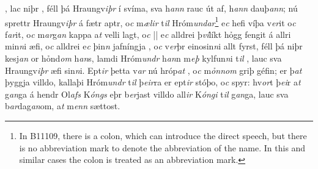 , 
 lac niþr
, 
féll þá Hraungv\textit{iþr} í  svíma,  sva h\textit{ann}  rauc  út af,    h\textit{ann} dauþ\textit{an}\textit{n}; nú  sprettr Hraungv\textit{iþr} á fætr aptr, o\textit{c} m\textit{ælir} t\textit{il}
Hróm\textit{undar}\footnote{In B11109, there is a colon, which can introduce the direct speech, but there is no abbreviation mark to denote the abbreviation of the name. In this and similar cases the colon is treated as an abbreviation mark.} 
e\textit{c} hefi  víþa v\textit{er}it o\textit{c}
f\textit{ar}it, o\textit{c} m\textit{ar}g\textit{an} kappa a\textit{t} velli lagt, o\textit{c}  ||
e\textit{c} alldrei þ\textit{ví}líkt hỏgg fengit á allri
min\textit{n}i æfi, o\textit{c} alldrei   e\textit{c} þin\textit{n} jafníngja  , o\textit{c} v\textit{er}þr einosin\textit{n}i allt  fyrst,
féll þá niþr kesj\textit{an} or hỏnd\textit{om} h\textit{an}s, lamdi Hróm\textit{undr} h\textit{an}n 
m\textit{eþ} kylfun\textit{n}i t\textit{il}   , 
lauc sva Hraungv\textit{iþr} æfi sin\textit{n}i. Ept\textit{ir} þetta v\textit{ar} nú  hróp\textit{at}  , o\textit{c} m\textit{ỏnnom}  griþ  géfin; er þ\textit{at}  þyggja  villdo, kallaþi
Hróm\textit{undr} t\textit{il} þ\textit{eir}ra er ept\textit{ir} stóþo,
o\textit{c} spyr:  hv\textit{or}t þ\textit{ei}r    a\textit{t} g\textit{an}ga á hendr Ol\textit{afs} K\textit{óngs} eþr   b\textit{er}jast   villdo all\textit{ir}   
K\textit{óngi} t\textit{il}  g\textit{an}ga, 
lauc sva b\textit{ar}dag\textit{an}om, a\textit{t} m\textit{enn} sættost.  \pend \endnumbering  

